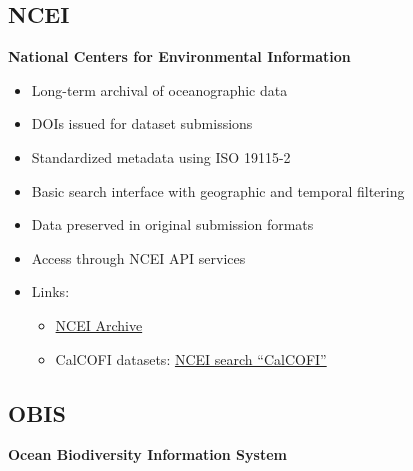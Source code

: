 \documentclass[
  letterpaper,
  DIV=11,
  numbers=noendperiod]{scrreprt}
\providecommand{\tightlist}{%
  \setlength{\itemsep}{0pt}\setlength{\parskip}{0pt}}
\begin{document}
\subsection{NCEI}\label{ncei}

\textbf{National Centers for Environmental Information}

\begin{itemize}
\tightlist
\item
  Long-term archival of oceanographic data
\item
  DOIs issued for dataset submissions
\item
  Standardized metadata using ISO 19115-2
\item
  Basic search interface with geographic and temporal filtering
\item
  Data preserved in original submission formats
\item
  Access through NCEI API services
\item
  Links:

  \begin{itemize}
  \tightlist
  \item
    \href{https://www.ncei.noaa.gov/archive}{NCEI Archive}
  \item
    CalCOFI datasets:
    \href{https://www.ncei.noaa.gov/access/search/index?q=CalCOFI}{NCEI
    search ``CalCOFI''}
  \end{itemize}
\end{itemize}

\subsection{OBIS}\label{obis}

\textbf{Ocean Biodiversity Information System}
\end{document}
